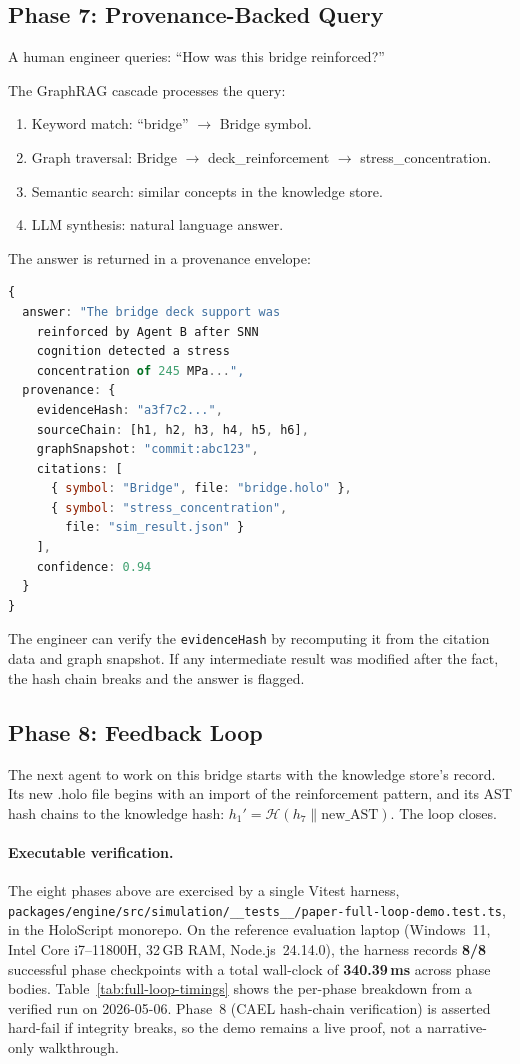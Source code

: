 \documentclass[sigchi-a]{acmart}
\newcommand{\hashfn}{\mathcal{H}}
\begin{document}
\subsection{Phase 7: Provenance-Backed Query}

A human engineer queries: ``How was this bridge reinforced?''

The GraphRAG cascade processes the query:
\begin{enumerate}
  \item Keyword match: ``bridge'' $\to$ Bridge symbol.
  \item Graph traversal: Bridge $\to$ deck\_reinforcement $\to$
    stress\_concentration.
  \item Semantic search: similar concepts in the knowledge store.
  \item LLM synthesis: natural language answer.
\end{enumerate}

The answer is returned in a provenance envelope:
\begin{lstlisting}[language=TypeScript,caption={Provenance envelope for a
knowledge query.}]
{
  answer: "The bridge deck support was
    reinforced by Agent B after SNN
    cognition detected a stress
    concentration of 245 MPa...",
  provenance: {
    evidenceHash: "a3f7c2...",
    sourceChain: [h1, h2, h3, h4, h5, h6],
    graphSnapshot: "commit:abc123",
    citations: [
      { symbol: "Bridge", file: "bridge.holo" },
      { symbol: "stress_concentration",
        file: "sim_result.json" }
    ],
    confidence: 0.94
  }
}
\end{lstlisting}

The engineer can verify the \texttt{evidenceHash} by recomputing it from
the citation data and graph snapshot. If any intermediate result was
modified after the fact, the hash chain breaks and the answer is flagged.

\subsection{Phase 8: Feedback Loop}

The next agent to work on this bridge starts with the knowledge store's
record. Its new .holo file begins with an import of the reinforcement
pattern, and its AST hash chains to the knowledge hash:
$h_1' = \hashfn(h_7 \| \text{new\_AST})$. The loop closes.

\paragraph{Executable verification.}
The eight phases above are exercised by a single Vitest harness,
\texttt{packages/engine/src/simulation/\_\_tests\_\_/paper-full-loop-demo.test.ts},
in the HoloScript monorepo. On the reference evaluation laptop (Windows~11,
Intel Core i7--11800H, 32\,GB RAM, Node.js~24.14.0), the harness records
\textbf{8/8} successful phase checkpoints with a total wall-clock of
\textbf{340.39\,ms} across phase bodies. Table~\ref{tab:full-loop-timings}
shows the per-phase breakdown from a verified run on 2026-05-06. Phase~8
(CAEL hash-chain verification) is asserted hard-fail if integrity breaks,
so the demo remains a live proof, not a narrative-only walkthrough.
\end{document}
